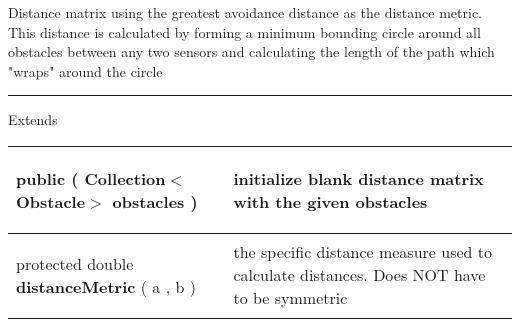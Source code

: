  {\scriptsize Distance matrix using the greatest avoidance distance as the distance metric. This distance is calculated by forming a minimum bounding circle around all obstacles\newline%
 between any two sensors and calculating the length of the path which "wraps" around the circle
 
\vspace*{4pt} \hrule \vspace*{3pt}
Extends \textbf{ \hyperref[tab:DistanceMatrix]{\color{blue}{DistanceMatrix}} }
\vspace*{-5pt} 
\begin{tabularx}{\linewidth}{X|m{}}
\label{tab:GreatestAvoidanceDistanceMatrix}
\begin{raggedleft}public  \textbf{\hyperref[tab:GreatestAvoidanceDistanceMatrix]{\color{blue}{GreatestAvoidanceDistanceMatrix}} }(\hspace*{ 5pt} \textbf{Collection$<$Obstacle$>$} obstacles  )
\end{raggedleft} &
 initialize blank distance matrix with the given obstacles\\ \hline 
\begin{raggedleft}protected double \textbf{distanceMetric }(\newline \hfill 
\hspace*{ 5pt} \textbf{\hyperref[tab:Sensor]{\color{blue}{Sensor}}} a , \newline
 \hspace*{ 5pt} \textbf{\hyperref[tab:Sensor]{\color{blue}{Sensor}}} b  )
\end{raggedleft} &
 the specific distance measure used to calculate distances. Does NOT have to be symmetric\\\end{tabularx}
}
